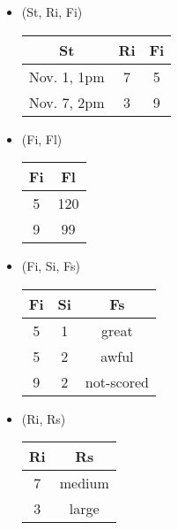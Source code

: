 \documentclass[12pt]{article}
\begin{document}
\begin{enumerate}
\begin{itemize}
\begin{center}
\begin{tabular}{c c}
                  \end{tabular}
                \end{center}
          \item (St, Ri, Fi)
                \begin{center}
                  \begin{tabular}{c c c}
                    \hline
                    St          & Ri & Fi \\
                    \hline
                    Nov. 1, 1pm & 7  & 5  \\
                    Nov. 7, 2pm & 3  & 9  \\
                    \hline
                  \end{tabular}
                \end{center}
          \item (Fi, Fl)
                \begin{center}
                  \begin{tabular}{c c}
                    \hline
                    Fi & Fl \\
                    \hline
                    5  & 120 \\
                    9  & 99 \\
                    \hline                    
                  \end{tabular}
                \end{center}
          \item (Fi, Si, Fs)
                \begin{center}
                  \begin{tabular}{c c c}
                    \hline
                    Fi & Si & Fs \\
                    \hline
                    5  & 1  & great \\
                    5  & 2  & awful \\
                    9  & 2  & not-scored \\
                    \hline
                  \end{tabular}
                \end{center}
          \item (Ri, Rs)
                \begin{center}
                  \begin{tabular}{c c }
                    \hline
                    Ri & Rs \\
                    \hline
                    7  & medium \\
                    3  & large \\
                    \hline
                  \end{tabular}
                \end{center}
        \end{itemize}
  \ \\


\end{enumerate}
\end{document}
